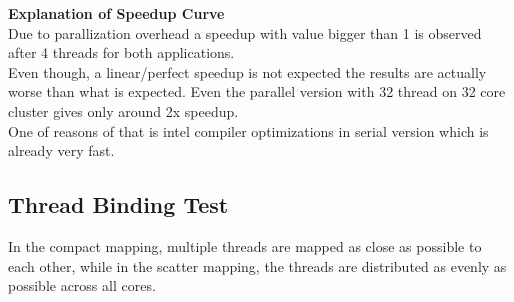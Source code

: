 \documentclass{article}
\newcommand\tab[1][0.5cm]{\hspace*{#1}}
\begin{document}
\textbf{Explanation of Speedup Curve}
\\
\tab Due to parallization overhead a speedup with value bigger than 1 is observed after 4 threads for both applications. \\
\tab Even though, a linear/perfect speedup is not expected the results are actually worse than what is expected.
Even the parallel version with 32 thread on 32 core cluster gives only around 2x speedup.\\
One of reasons of that is intel compiler optimizations in serial version which is already very fast.\\

\newpage

\subsection{Thread Binding Test}
\tab In the compact mapping, multiple threads are mapped as close as possible to each other, 
while in the scatter mapping, the threads are distributed as evenly as possible across all cores. 
\end{document}
